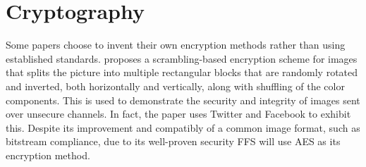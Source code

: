 \section{Cryptography}
Some papers choose to invent their own encryption methods rather than using established standards. \citeauthor{chumanEncryptionThenCompressionSystemsUsing2019} proposes a scrambling-based encryption scheme for images that splits the picture into multiple rectangular blocks that are randomly rotated and inverted, both horizontally and vertically, along with shuffling of the color components\cite{chumanEncryptionThenCompressionSystemsUsing2019}. This is used to demonstrate the security and integrity of images sent over unsecure channels. In fact, the paper uses Twitter and Facebook to exhibit this. Despite its improvement and compatibly of a common image format, such as bitstream compliance, due to its well-proven security FFS will use AES as its encryption method. 